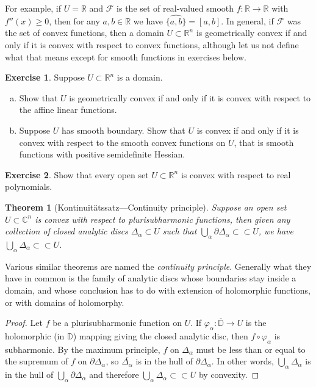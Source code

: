 \documentclass[12pt,openany]{book}
\newcommand{\C}{{\mathbb{C}}}
\newcommand{\R}{{\mathbb{R}}}
\newcommand{\D}{{\mathbb{D}}}
\newcommand{\sF}{{\mathscr{F}}}
\theoremstyle{plain}
\newtheorem{thm}{Theorem}[section]
\theoremstyle{remark}
\theoremstyle{definition}
\newenvironment{exbox}{%
    \def\FrameCommand{\vrule width 1pt \relax\hspace{10pt}}%
    \MakeFramed {\advance \hsize -\width \FrameRestore}%
}{%
    \endMakeFramed
}
\newenvironment{exparts}{%
    \leavevmode\begin{enumerate}[a),noitemsep,topsep=0pt,parsep=0pt,partopsep=0pt]
}{%
    \end{enumerate}
}
\theoremstyle{exercise}
\newtheorem{exercise}{Exercise}[section]
\theoremstyle{example}
\begin{document}
For example, if $U=\R$ and $\sF$ is the set of real-valued smooth
$f \colon \R \to \R$ with $f''(x) \geq 0$, then for any $a,b \in \R$
we have $\widehat{\{ a, b \}} = [a,b]$.
In general, if $\sF$ was the set of convex functions, then 
a domain $U \subset \R^n$ is geometrically convex if and only if it is
convex with respect to convex functions, although let us not define
what that means except for smooth functions in exercises below.

\begin{exbox}
\begin{exercise} \label{exercise:geomconvexfuncs}
Suppose $U \subset \R^n$ is a domain.
\begin{exparts}
\item
Show that $U$
is geometrically convex if and only if it is
convex with respect to the affine linear functions.
\item
Suppose $U$
has smooth boundary.
Show that $U$ is 
convex if and only if it is
convex with respect to the smooth convex functions on $U$,
that is smooth functions with positive semidefinite Hessian.
\end{exparts}
\end{exercise}

\begin{exercise}
Show that every open set $U \subset \R^n$ is convex with respect to real
polynomials.
\end{exercise}
\end{exbox}

\begin{thm}[Kontinuit\"atssatz---Continuity
principle]
\label{thm:contprinciple}
Suppose an open set $U \subset \C^n$ is convex with respect to plurisubharmonic
functions,
then given any collection of closed analytic discs $\Delta_\alpha \subset U$
such that $\bigcup_\alpha \partial \Delta_\alpha \subset \subset U$,
we have
$\bigcup_\alpha \Delta_\alpha \subset \subset U$.
\end{thm}

Various similar theorems are named the \emph{continuity principle}.
Generally what they have in common is the family of analytic discs whose
boundaries stay inside a domain, and whose conclusion has to do
with extension of holomorphic functions, or with domains of holomorphy.

\begin{proof}
Let $f$ be a plurisubharmonic function on $U$.  If $\varphi_\alpha \colon
\overline{\D} \to U$ is the holomorphic (in $\D$) mapping giving the closed
analytic disc, then $f \circ \varphi_\alpha$ is subharmonic.
By the maximum principle,
$f$ on $\Delta_\alpha$ must be less than or equal to the supremum
of $f$ on $\partial \Delta_\alpha$, so $\overline{\Delta_\alpha}$
is in the hull of 
$\partial \Delta_\alpha$.
In other words,
$\bigcup_\alpha \Delta_\alpha$ is in the hull of
$\bigcup_\alpha \partial \Delta_\alpha$ and therefore 
$\bigcup_\alpha \Delta_\alpha \subset \subset U$ by convexity.
\end{proof}
\end{document}
